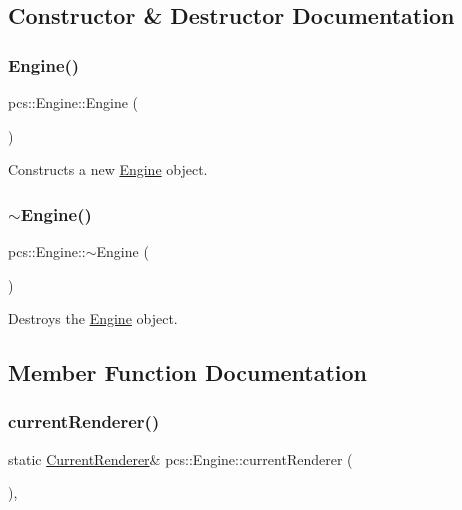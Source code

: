 \subsection{Constructor \& Destructor Documentation}
\mbox{\label{classpcs_1_1Engine_a73a5c3ce66c2c033835f19f95b67f3ea}} 
\subsubsection{\texorpdfstring{Engine()}{Engine()}}
{\footnotesize\ttfamily pcs\+::\+Engine\+::\+Engine (\begin{DoxyParamCaption}{ }\end{DoxyParamCaption})}



Constructs a new \hyperlink{classpcs_1_1Engine}{Engine} object. 

\mbox{\label{classpcs_1_1Engine_aa6a523009abf3a61d9682a846c780207}} 
\subsubsection{\texorpdfstring{$\sim$\+Engine()}{~Engine()}}
{\footnotesize\ttfamily pcs\+::\+Engine\+::$\sim$\+Engine (\begin{DoxyParamCaption}{ }\end{DoxyParamCaption})}



Destroys the \hyperlink{classpcs_1_1Engine}{Engine} object. 



\subsection{Member Function Documentation}
\mbox{\label{classpcs_1_1Engine_a1d7243c13d74af4d40b280201ff1feff}} 
\subsubsection{\texorpdfstring{current\+Renderer()}{currentRenderer()}}
{\footnotesize\ttfamily static \hyperlink{namespacepcs_ad2936e1e1cc9e4a344e2e90394d38ea2}{Current\+Renderer}\& pcs\+::\+Engine\+::current\+Renderer (\begin{DoxyParamCaption}{ }\end{DoxyParamCaption})\hspace{0.3cm}{\ttfamily [inline]}, {\ttfamily [static]}}

